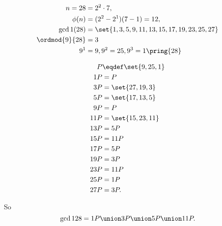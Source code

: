 \begin{align*}
n = 28 & = 2^2 \cdot 7,\\
\phi(n) & = (2^2 -2^1)(7-1) = 12,\\
\gcd1(28) & = \set{1, 3, 5, 9, 11, 13, 15, 17, 19, 23, 25, 27}\\
\ordmod{9}{28} & = 3\\
9^1 & = 9, 9^2 = 25, 9^3 = 1 \pring{28}
\end{align*}


\begin{align*}
P & \eqdef \set{9, 25, 1}\\
1P & = P\\
3P & = \set{27, 19, 3}\\
5P & = \set{17, 13, 5}\\
9P & = P\\
11P & = \set{15, 23, 11}\\
13P & = 5P\\
15P & = 11P\\
17P & = 5P\\
19P & = 3P\\
23P & = 11P\\
25P & = 1P\\
27P & = 3P.
\end{align*}

So
\begin{equation}\label{cosets28}
\gcd1{28} = 1P \union 3P \union 5P \union 11P.
\end{equation}
